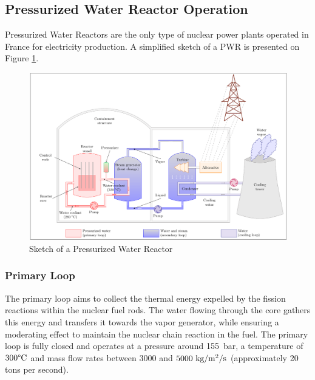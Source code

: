 %
%
%



\subsection{Pressurized Water Reactor Operation}

Pressurized Water Reactors are the only type of nuclear power plants operated in France for electricity production. A simplified sketch of a PWR is presented on Figure \ref{fig:pwr_sketch}.

\begin{figure}[!h]
\centering
\includegraphics[width=1.0\linewidth]{img/intro/pwr_tikz.pdf}
\caption{Sketch of a Pressurized Water Reactor \cite{faccanoni_etude_2008}}
\label{fig:pwr_sketch}
\end{figure}

\npar

\subsubsection{Primary Loop}

The primary loop aims to collect the thermal energy expelled by the fission reactions within the nuclear fuel rods. The water flowing through the core gathers this energy and transfers it towards the vapor generator, while ensuring a moderating effect to maintain the nuclear chain reaction in the fuel. The primary loop is fully closed and operates at a pressure around 155\ bar, a temperature of $300\degree\mathrm{C}$ and mass flow rates between $3000$ and $5000\ \text{kg/m$^{2}$/s}$ (approximately 20 tons per second).  


